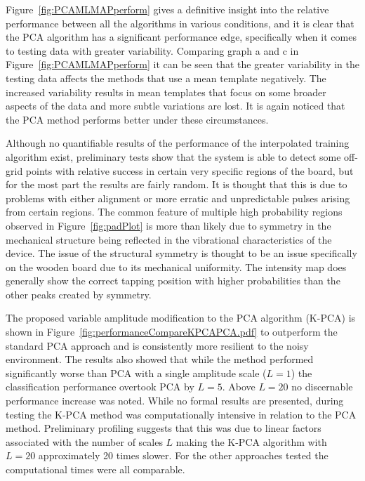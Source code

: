 Figure~\ref{fig:PCAMLMAPperform} gives a definitive insight into the relative performance between all the algorithms in various conditions, and it is clear that the PCA algorithm has a significant performance edge, specifically when it comes to testing data with greater variability. Comparing graph a and c in Figure~\ref{fig:PCAMLMAPperform} it can be seen that the greater variability in the testing data affects the methods that use a mean template negatively. The increased variability results in mean templates that focus on some broader aspects of the data and more subtle variations are lost. It is again noticed that the PCA method performs better under these circumstances.

Although no quantifiable results of the performance of the interpolated training algorithm exist, preliminary tests show that the system is able to detect some off- grid points with relative success in certain very specific regions of the board, but for the most part the results are fairly random. It is thought that this is due to problems with either alignment or more erratic and unpredictable pulses arising from certain regions. The common feature of multiple high probability regions observed in Figure~\ref{fig:padPlot} is more than likely due to symmetry in the mechanical structure being reflected in the vibrational characteristics of the device. The issue of the structural symmetry is thought to be an issue specifically on the wooden board due to its mechanical uniformity. The intensity map does generally show the correct tapping position with higher probabilities than the other peaks created by symmetry.

The proposed variable amplitude modification to the PCA algorithm (K-PCA) is shown in Figure~\ref{fig:performanceCompareKPCAPCA.pdf} to outperform the standard PCA approach and is consistently more resilient to the noisy environment. The results also showed that while the method performed significantly worse than PCA with a single amplitude scale ($L=1$) the classification performance overtook PCA by $L=5$. Above $L=20$ no discernable performance increase was noted. While no formal results are presented, during testing the K-PCA method was computationally intensive in relation to the PCA method. Preliminary profiling suggests that this was due to linear factors associated with the number of scales $L$ making the K-PCA algorithm with $L=20$ approximately 20 times slower. For the other approaches tested the computational times were all comparable.

